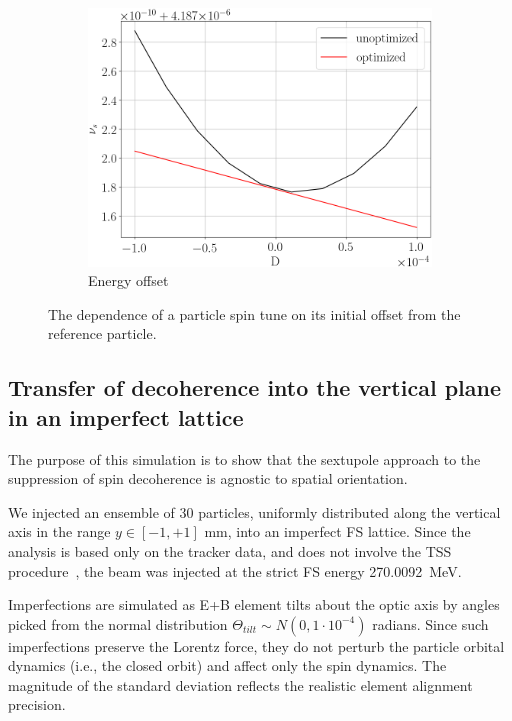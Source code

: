 \begin{figure}[!h]\ContinuedFloat\centering
	\begin{subfigure}{\linewidth}
		\includegraphics[height=.35\paperheight]{images/decoh_sim/spin_tune_decoh_d_offset}
		\caption{Energy offset}
	\end{subfigure}
	\caption{The dependence of a particle spin tune on its initial offset
          from the reference particle.\label{fig:decoh:perfect}}
\end{figure}

\subsection{Transfer of decoherence into the vertical plane in an imperfect lattice}
The purpose of this simulation is to show that the sextupole approach to the suppression of spin decoherence 
is agnostic to spatial orientation.

We injected an ensemble of 30 particles, uniformly distributed along the vertical axis in the range
$y \in [-1, +1]$ mm, into an imperfect FS lattice. Since the analysis is based only on the tracker data,
and does not involve the TSS procedure~\cite{COSYINF:Manual:BeamPhys}, the beam was injected at the strict FS energy 270.0092~MeV.

Imperfections are simulated as E+B element tilts about the optic axis by angles picked from the normal
distribution $\Theta_{tilt} \sim N(0, 1\cdot 10^{-4})$ radians. Since such imperfections preserve the
Lorentz force, they do not perturb the particle orbital dynamics (i.e., the closed orbit) 
and affect only the spin dynamics.
The magnitude of the standard deviation reflects the realistic element alignment precision.

